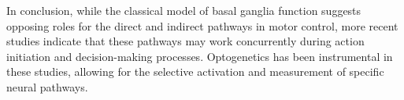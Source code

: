 \documentclass[10pt]{article}
\begin{document}
\begin{sloppypar}
  In conclusion, while the classical model of basal ganglia function suggests opposing roles for the direct and indirect pathways in motor control, more recent studies indicate that these pathways may work concurrently during action initiation and decision-making processes. Optogenetics has been instrumental in these studies, allowing for the selective activation and measurement of specific neural pathways.

  \pagebreak
  \singlespacing %
  
  

\end{sloppypar}
\end{document}

